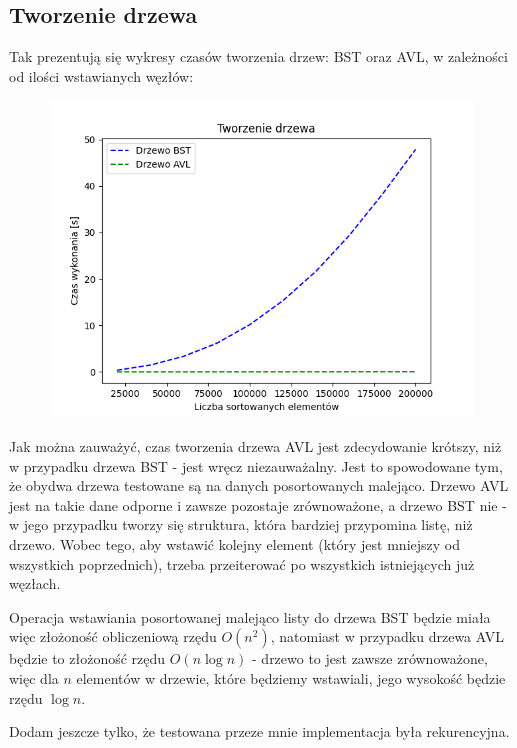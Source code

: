 \documentclass[12pt]{article}
\begin{document}
        \subsection{Tworzenie drzewa}
        Tak prezentują się wykresy czasów tworzenia drzew: BST oraz AVL, w zależności od ilości wstawianych węzłów:
        \begin{figure}[h]
            \centering
            \includegraphics[width=\textwidth]{wykresy/Tworzenie_drzewa.png}
        \end{figure}
        
        Jak można zauważyć, czas tworzenia drzewa AVL jest zdecydowanie krótszy, niż w przypadku drzewa BST - jest wręcz niezauważalny. Jest to spowodowane tym, że obydwa drzewa testowane są na danych posortowanych malejąco. Drzewo AVL jest na takie dane odporne i zawsze pozostaje zrównoważone, a drzewo BST nie - w jego przypadku tworzy się struktura, która bardziej przypomina listę, niż drzewo. Wobec tego, aby wstawić kolejny element (który jest mniejszy od wszystkich poprzednich), trzeba przeiterować po wszystkich istniejących już węzłach.
        
        Operacja wstawiania posortowanej malejąco listy do drzewa BST będzie miała więc złożoność obliczeniową rzędu $O(n^2)$, natomiast w przypadku drzewa AVL będzie to złożoność rzędu $O(n\log{n})$ - drzewo to jest zawsze zrównoważone, więc dla $n$ elementów w drzewie, które będziemy wstawiali, jego wysokość będzie rzędu $\log{n}$.
        
        Dodam jeszcze tylko, że testowana przeze mnie implementacja była rekurencyjna.
        
\end{document}
